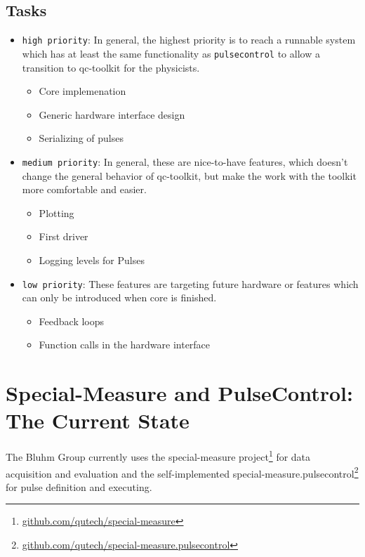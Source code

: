 \documentclass[a4paper,12pt]{article}
\begin{document}
\subsection{Tasks}
\begin{itemize} \itemsep-0.5pt
 \item \texttt{high priority}: In general, the highest priority is to reach a runnable system which has at least the same functionality as \texttt{pulsecontrol} to allow a transition to qc-toolkit for the physicists.
 \begin{itemize} \itemsep-0.5pt
  \item Core implemenation
  \item Generic hardware interface design
  \item Serializing of pulses
 \end{itemize}
  \item \texttt{medium priority}: In general, these are nice-to-have features, which doesn't change the general behavior of qc-toolkit, but make the work with the toolkit more comfortable and easier.
 \begin{itemize} \itemsep-0.5pt
  \item Plotting
  \item First driver
  \item Logging levels for Pulses
 \end{itemize}
 \item \texttt{low priority}: These features are targeting future hardware or features which can only be introduced when core is finished.
 \begin{itemize} \itemsep-0.5pt
  \item Feedback loops
  \item Function calls in the hardware interface
 \end{itemize}
\end{itemize}

\section{Special-Measure and PulseControl: The Current State}
\label{sec:CurrentState}
The Bluhm Group currently uses the special-measure project\footnote{\href{https://github.com/qutech/special-measure}{github.com/qutech/special-measure}} for data acquisition and evaluation and the self-implemented special-measure.pulsecontrol\footnote{\href{https://github.com/qutech/special-measure.pulsecontrol}{github.com/qutech/special-measure.pulsecontrol}} for pulse definition and executing.
\end{document}
